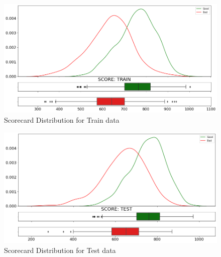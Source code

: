 \begin{figure}
\centering
  \centering
  \includegraphics[width=0.9\linewidth]{figs/scorecard_dist_train.png}
  \caption{Scorecard Distribution for Train data}
  \label{fig:sc_dist_train}
\end{figure}

\begin{figure}
\centering
  \centering
  \includegraphics[width=0.9\linewidth]{figs/scorecard_dist_test.png}
  \caption{Scorecard Distribution for Test data}
  \label{fig:sc_dist_test}
\end{figure}
